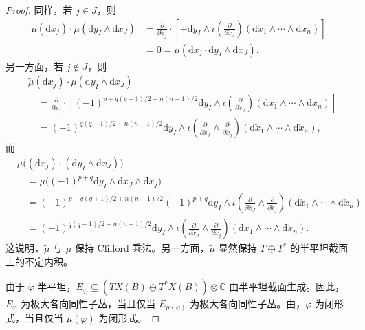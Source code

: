 \begin{proof}
同样，若 $j\in J$，则
\[
\begin{aligned}
\widetilde\mu(\mathrm dx_j)\cdot\mu(\mathrm dy_I\wedge\mathrm dx_J)
&=\frac{\partial}{\partial\check x_j}\cdot
\left[\pm\mathrm dy_I\wedge
\iota\!\left(\frac{\partial}{\partial\check x_J}\right)
(\mathrm d\check x_1\wedge\cdots\wedge\mathrm d\check x_n)\right]\\
&=0=\mu(\mathrm dx_j\cdot\mathrm dy_I\wedge\mathrm dx_J).
\end{aligned}
\]
另一方面，若 $j\notin J$，则
\[
\begin{aligned}
&\widetilde\mu(\mathrm dx_j)\cdot\mu(\mathrm dy_I\wedge\mathrm dx_J)\\
&\quad=\frac{\partial}{\partial\check x_j}\cdot
\left[(-1)^{p+q(q-1)/2+n(n-1)/2}\mathrm dy_I\wedge
\iota\!\left(\frac{\partial}{\partial\check x_J}\right)
(\mathrm d\check x_1\wedge\cdots\wedge\mathrm d\check x_n)\right]\\
&\quad=(-1)^{q(q-1)/2+n(n-1)/2}\mathrm dy_I\wedge
\iota\!\left(\frac{\partial}{\partial\check x_J}\wedge
\frac{\partial}{\partial\check x_j}\right)
(\mathrm d\check x_1\wedge\cdots\wedge\mathrm d\check x_n),
\end{aligned}
\]
而
\[
\begin{aligned}
&\mu\bigl((\mathrm dx_j)\cdot(\mathrm dy_I\wedge\mathrm dx_J)\bigr)\\
&\quad=\mu\bigl((-1)^{p+q}\mathrm dy_I\wedge\mathrm dx_J\wedge\mathrm dx_j\bigr)\\
&\quad=(-1)^{p+q(q+1)/2+n(n-1)/2}(-1)^{p+q}\mathrm dy_I\wedge
\iota\!\left(\frac{\partial}{\partial\check x_J}\wedge
\frac{\partial}{\partial\check x_j}\right)
(\mathrm d\check x_1\wedge\cdots\wedge\mathrm d\check x_n)\\
&\quad=(-1)^{q(q-1)/2+n(n-1)/2}\mathrm dy_I\wedge
\iota\!\left(\frac{\partial}{\partial\check x_J}\wedge
\frac{\partial}{\partial\check x_j}\right)
(\mathrm d\check x_1\wedge\cdots\wedge\mathrm d\check x_n).
\end{aligned}
\]
这说明，$\widetilde\mu$ 与 $\mu$ 保持 Clifford 乘法。另一方面，$\widetilde\mu$ 显然保持 $T\oplus T^*$ 的半平坦截面上的不定内积。

由于 $\varphi$ 半平坦，$E_\varphi\subseteq(TX(B)\oplus T^*X(B))\otimes\mathbb C$ 由半平坦截面生成。因此，$E_\varphi$ 为极大各向同性子丛，当且仅当 $E_{\mu(\varphi)}$ 为极大各向同性子丛。由，$\varphi$ 为闭形式，当且仅当 $\mu(\varphi)$ 为闭形式。


\end{proof}
